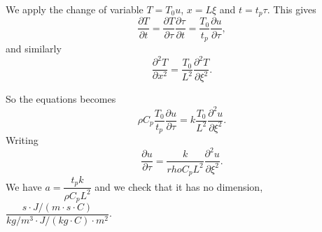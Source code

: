 
We apply the change of variable $T=T_{0}u$, $x=L\xi$ and $t=t_{p}\tau$. This gives 
$$\dfrac{\partial T}{\partial t } = \dfrac{\partial T}{\partial \tau }\dfrac{\partial \tau}{\partial t }= \dfrac{T_0}{t_p}\dfrac{\partial u}{\partial \tau },$$
and similarly 
$$\dfrac{\partial^2 T}{\partial x^2} =  \dfrac{T_0}{L^2} \dfrac{\partial^2 T}{\partial \xi^2}.$$

So the equations becomes 
$$\rho C_p \dfrac{T_0}{t_p}\dfrac{\partial u}{\partial \tau } = k \dfrac{T_0}{L^2} \dfrac{\partial^2 u}{\partial \xi^2 }.$$
Writing 
$$ \dfrac{\partial u}{\partial \tau } =  \dfrac{k}{rho C_p L^2} \dfrac{\partial^2 u}{\partial \xi^2 }.$$
We have $a=\dfrac{t_p k}{\rho C_p L^2}$ and we check that it has no dimension, $\dfrac{s \cdot J/(m \cdot s \cdot C) }{kg/m^3 \cdot J/(kg \cdot C) \cdot m^2}$.








  